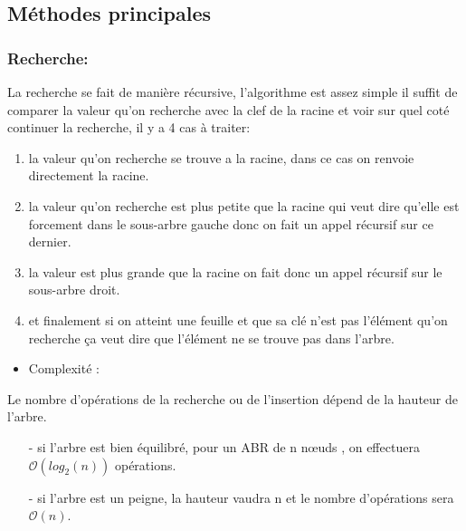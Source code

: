 \documentclass{report}
\begin{document}
\subsection{Méthodes principales}
\subsubsection{Recherche:} 
La recherche se fait de manière récursive, l'algorithme est assez simple il suffit de comparer la valeur qu'on recherche avec la clef de la racine et voir sur quel coté continuer la recherche, il y a 4 cas à traiter:
\begin{enumerate}
	\item la valeur qu'on recherche se trouve a la racine, dans ce cas on renvoie directement la racine.
	\item la valeur qu'on recherche est plus petite que la racine qui veut dire qu'elle est forcement dans le sous-arbre gauche donc on fait un appel récursif sur ce dernier.
	\item la valeur est plus grande que la racine on fait donc un appel récursif sur le sous-arbre droit.
	\item et finalement si on atteint une feuille et que sa clé n'est pas l'élément qu'on recherche ça veut dire que l'élément ne se trouve pas dans l'arbre.
\end{enumerate}
\begin{itemize}
    \item Complexité :
\end{itemize} 
Le nombre d’opérations de la recherche ou de l’insertion dépend de la hauteur de l’arbre.
\begin{itemize}
	\item[-]si l’arbre est bien équilibré, pour un ABR de n nœuds , on effectuera $\mathcal{O}(log_2(n))$ opérations.
	\item[-]si l’arbre est un peigne, la hauteur vaudra n et le nombre d’opérations sera $\mathcal{O}(n)$.
\end{itemize}
\end{document}
